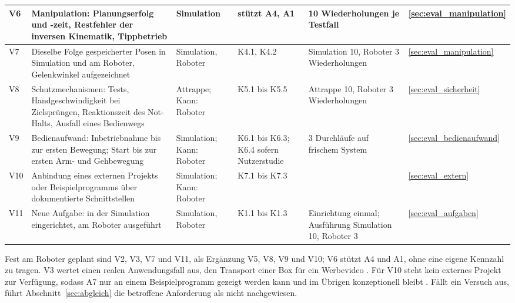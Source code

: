 \begin{table}[!ht]
\begin{tabularx}{\textwidth}{|P{0.85cm}|L|P{1.9cm}|P{1.75cm}|P{2.3cm}|P{1.25cm}|}
        V6 & Manipulation: Planungserfolg und -zeit, Restfehler der inversen Kinematik, Tippbetrieb & Simulation & stützt A4, A1 & 10 Wiederholungen je Testfall %
        & \ref{sec:eval_manipulation}\\\hline
        V7 & Dieselbe Folge gespeicherter Posen in Simulation und am Roboter, Gelenkwinkel aufgezeichnet & Simulation, Roboter & K4.1, K4.2 & Simulation 10, Roboter 3 Wiederholungen %
        & \ref{sec:eval_manipulation}\\\hline
        V8 & Schutzmechanismen: Tests, Handgeschwindigkeit bei Zielsprüngen, Reaktionszeit des Not-Halts, Ausfall eines Bedienwegs & Attrappe; Kann: Roboter & K5.1 bis K5.5 & Attrappe 10, Roboter 3 Wiederholungen %
        & \ref{sec:eval_sicherheit}\\\hline
        V9 & Bedienaufwand: Inbetriebnahme bis zur ersten Bewegung; Start bis zur ersten Arm- und Gehbewegung & Simulation; Kann: Roboter & K6.1 bis K6.3; K6.4 sofern Nutzerstudie & 3 Durchläufe auf frischem System %
        & \ref{sec:eval_bedienaufwand}\\\hline
        V10 & Anbindung eines externen Projekts oder Beispielprogramms über dokumentierte Schnittstellen & Simulation; Kann: Roboter & K7.1 bis K7.3 &  & \ref{sec:eval_extern}\\\hline
        V11 & Neue Aufgabe: in der Simulation eingerichtet, am Roboter ausgeführt & Simulation, Roboter & K1.1 bis K1.3 & Einrichtung einmal; Ausführung Simulation 10, Roboter 3 %
        & \ref{sec:eval_aufgaben}\\\hline
    \end{tabularx}
\end{table}

Fest am Roboter geplant sind V2, V3, V7 und V11, als Ergänzung V5, V8, V9 und V10; V6 stützt A4 und A1, ohne eine eigene Kennzahl zu tragen.
V3 wertet einen realen Anwendungsfall aus, den Transport einer Box für ein Werbevideo .
Für V10 steht kein externes Projekt zur Verfügung, sodass A7 nur an einem Beispielprogramm gezeigt werden kann und im Übrigen konzeptionell bleibt .
Fällt ein Versuch aus, führt Abschnitt~\ref{sec:abgleich} die betroffene Anforderung als nicht nachgewiesen.


